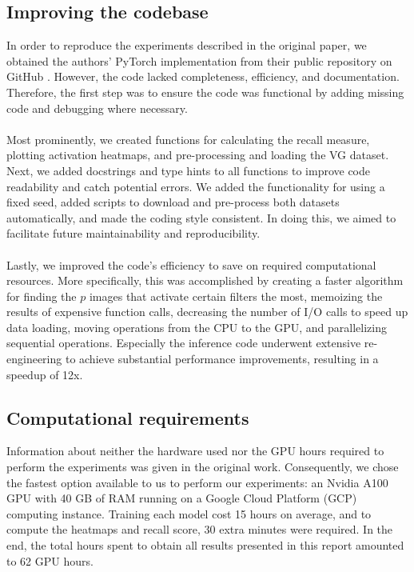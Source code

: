 \subsection{Improving the codebase} \label{sec:Improving the codebase}
In order to reproduce the experiments described in the original paper, we obtained the authors' PyTorch implementation from their public repository on GitHub \cite{lavise-repo}. However, the code lacked completeness, efficiency, and documentation. Therefore, the first step was to ensure the code was functional by adding missing code and debugging where necessary.
\\\\
Most prominently, we created functions for calculating the recall measure, plotting activation heatmaps, and pre-processing and loading the VG dataset. Next, we added docstrings and type hints to all functions to improve code readability and catch potential errors. We added the functionality for using a fixed seed, added scripts to download and pre-process both datasets automatically, and made the coding style consistent. In doing this, we aimed to facilitate future maintainability and reproducibility.
\\\\
Lastly, we improved the code's efficiency to save on required computational resources. More specifically, this was accomplished by creating a faster algorithm for finding the $p$ images that activate certain filters the most, memoizing the results of expensive function calls, decreasing the number of I/O calls to speed up data loading, moving operations from the CPU to the GPU, and parallelizing sequential operations. Especially the inference code underwent extensive re-engineering to achieve substantial performance improvements, resulting in a speedup of 12x.

\subsection{Computational requirements} \label{sec:Computational requirements}
Information about neither the hardware used nor the GPU hours required to perform the experiments was given in the original work. Consequently, we chose the fastest option available to us to perform our experiments: an Nvidia A100 GPU with 40 GB of RAM running on a Google Cloud Platform (GCP) computing instance. Training each model cost 15 hours on average, and to compute the heatmaps and recall score, 30 extra minutes were required. In the end, the total hours spent to obtain all results presented in this report amounted to 62 GPU hours.


